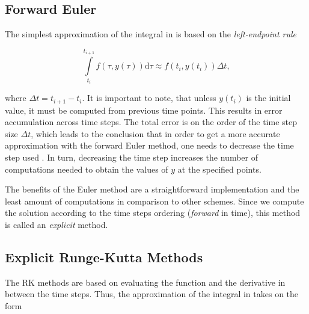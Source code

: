 \subsection{Forward Euler}
\label{subsection:forward_euler}

The simplest approximation of the integral in  is based on the \emph{left-endpoint rule} \cite{Gockenbach2011}

\begin{equation}
  \int \limits_{t_i}^{t_{i+1}} f(\tau, y(\tau)) \mathrm{d} \tau \approx f(t_i, y(t_i))\Delta t,
  \label{eq:forward_euler}
\end{equation}

where $\Delta t = t_{i+1} - t_i$. It is important to note, that unless $y(t_i)$ is the initial value, it must be computed from previous time points. This results in error accumulation across time steps. The total error is on the order of the time step size $\Delta t$, which leads to the conclusion that in order to get a more accurate approximation with the forward Euler method, one needs to decrease the time step used \cite{Gockenbach2011}. In turn, decreasing the time step increases the number of computations needed to obtain the values of $y$ at the specified points.

The benefits of the Euler method are a straightforward implementation and the least amount of computations in comparison to other schemes. Since we compute the solution according to the time steps ordering (\emph{forward} in time), this method is called an \emph{explicit} method.

\subsection{Explicit Runge-Kutta Methods}
\label{subsection:runge_kutta_methods}

The \ac{RK} methods are based on evaluating the function and the derivative in between the time steps. Thus, the approximation of the integral in  takes on the form \cite{Gockenbach2011}

